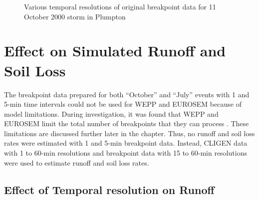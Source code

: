 \begin{figure}[htbp]
    \qquad
  \caption{Various temporal resolutions of original breakpoint data for 11
October
2000 storm in Plumpton}
  \label{fig:pl_storm}
\end{figure}

\section{Effect on Simulated Runoff and Soil Loss}
\label{sec:TemporalScalesSimulatedRunoffAndSoilLoss}

The breakpoint data prepared for both ``October'' and ``July'' events with 1 and
5-min time intervals could not be used for WEPP and EUROSEM because of model
limitations. During investigation, it was found that WEPP and EUROSEM limit the
total number of breakpoints that they can process
\citep{flanagan1995-weppusersummary, morgan1998-europeansoilerosion}. These
limitations are discussed further later in the chapter. Thus, no runoff and soil
loss rates were estimated with 1 and 5-min breakpoint data. Instead, CLIGEN data
with 1 to 60-min resolutions and breakpoint data with 15 to 60-min resolutions
were used to estimate runoff and soil loss rates.

\subsection{Effect of Temporal resolution on Runoff}
\label{sec:TemporalScalesSimulatedRunoff}

